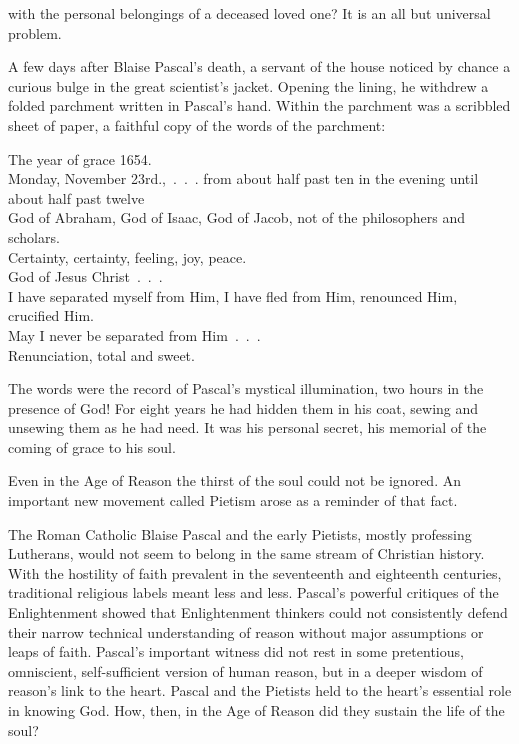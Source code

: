 
 with the personal belongings of a deceased loved one? It is an all but
universal problem.

A few days after Blaise Pascal’s death, a servant of the house noticed by chance a curious bulge in
the great scientist’s jacket. Opening the lining, he withdrew a folded parchment written in Pascal’s
hand. Within the parchment was a scribbled sheet of paper, a faithful copy of the words of the
parchment:

\begin{poem}
The year of grace 1654.\\
Monday, November 23rd.,~.~.~. from about half past ten in the evening until about half past twelve\\
God of Abraham, God of Isaac, God of Jacob, not of the philosophers and scholars.\\
Certainty, certainty, feeling, joy, peace.\\
God of Jesus Christ~.~.~.\\
I have separated myself from Him, I have fled from Him, renounced Him, crucified Him.\\
May I never be separated from Him~.~.~.\\
Renunciation, total and sweet.
\end{poem}

The words were the record of Pascal’s mystical illumination, two hours in the presence of God! For
eight years he had hidden them in his coat, sewing and unsewing them as he had need. It was his
personal secret, his memorial of the coming of grace to his soul.

Even in the Age of Reason the thirst of the soul could not be ignored. An important new movement
called Pietism arose as a reminder of that fact.

The Roman Catholic Blaise Pascal and the early Pietists, mostly professing Lutherans, would not seem
to belong in the same stream of Christian history. With the hostility of faith prevalent in the
seventeenth and eighteenth centuries, traditional religious labels meant less and less. Pascal’s
powerful critiques of the Enlightenment showed that Enlightenment thinkers could not consistently
defend their narrow technical understanding of reason without major assumptions or leaps of faith.
Pascal’s important witness did not rest in some pretentious, omniscient, self-sufficient version of
human reason, but in a deeper wisdom of reason’s link to the heart. Pascal and the Pietists held to
the heart’s essential role in knowing God. How, then, in the Age of Reason did they sustain the life
of the soul?

